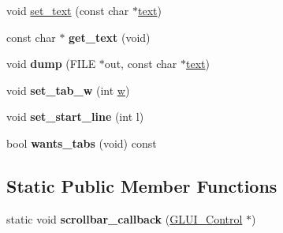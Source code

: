\begin{DoxyCompactItemize}
\item 
void \hyperlink{class_g_l_u_i___text_box_a99733f4d591d54f26237f7c8023411b0}{set\+\_\+text} (const char $\ast$\hyperlink{class_g_l_u_i___control_af0d60e9736f4dbc34e9a536e75876d72}{text})
\item 
\hypertarget{class_g_l_u_i___text_box_a052758e34ba64b19325c4e9be1cfcbb0}{const char $\ast$ {\bfseries get\+\_\+text} (void)}\label{class_g_l_u_i___text_box_a052758e34ba64b19325c4e9be1cfcbb0}

\item 
\hypertarget{class_g_l_u_i___text_box_aaf0af110ab2ad903387ad174daa8d986}{void {\bfseries dump} (F\+I\+L\+E $\ast$out, const char $\ast$\hyperlink{class_g_l_u_i___control_af0d60e9736f4dbc34e9a536e75876d72}{text})}\label{class_g_l_u_i___text_box_aaf0af110ab2ad903387ad174daa8d986}

\item 
\hypertarget{class_g_l_u_i___text_box_a6d461630cec6d9a388ad92f31fc052b1}{void {\bfseries set\+\_\+tab\+\_\+w} (int \hyperlink{class_g_l_u_i___control_aca82a099b9cbbadb188794cbfb06aa27}{w})}\label{class_g_l_u_i___text_box_a6d461630cec6d9a388ad92f31fc052b1}

\item 
\hypertarget{class_g_l_u_i___text_box_a36e8f773e0bcd48aebc103e3d9b24903}{void {\bfseries set\+\_\+start\+\_\+line} (int l)}\label{class_g_l_u_i___text_box_a36e8f773e0bcd48aebc103e3d9b24903}

\item 
\hypertarget{class_g_l_u_i___text_box_adb058a900dfbf996ad9c24db82ab66c3}{bool {\bfseries wants\+\_\+tabs} (void) const }\label{class_g_l_u_i___text_box_adb058a900dfbf996ad9c24db82ab66c3}

\end{DoxyCompactItemize}
\subsection*{Static Public Member Functions}
\begin{DoxyCompactItemize}
\item 
\hypertarget{class_g_l_u_i___text_box_a404d9344bf6af8855d379d006001a3a4}{static void {\bfseries scrollbar\+\_\+callback} (\hyperlink{class_g_l_u_i___control}{G\+L\+U\+I\+\_\+\+Control} $\ast$)}\label{class_g_l_u_i___text_box_a404d9344bf6af8855d379d006001a3a4}

\end{DoxyCompactItemize}
